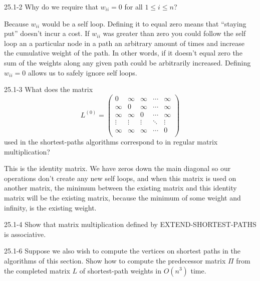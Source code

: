 




\homeworkheader{\classnameandsection}

\begin{problem}{25.1-2}
  Why do we require that $w_{ii} = 0$ for all $1 \le i \le n$?
  \begin{solution}
    Because $w_{ii}$ would be a self loop. Defining it to equal zero means that ``staying put'' doesn't incur a cost. If
    $w_{ii}$ was greater than zero you could follow the self loop an a particular node in a path an arbitrary amount of
    times and increase the cumulative weight of the path.  In other words, if it doesn't equal zero the sum of the
    weights along any given path could be arbitrarily increased. Defining $w_{ii} = 0$ allows us to safely ignore self
    loops.
  \end{solution}
\end{problem}

\begin{problem}{25.1-3}
What does the matrix
\[
 L^{(0)} =
 \begin{pmatrix}
  0 & \infty & \infty & \cdots & \infty\\
  \infty & 0 & \infty & \cdots & \infty\\
  \infty & \infty & 0 & \cdots & \infty\\
  \vdots & \vdots & \vdots & \ddots & \vdots \\
  \infty & \infty & \infty & \cdots & 0 \\
 \end{pmatrix}
\]
used in the shortest-paths algorithms correspond to in regular matrix multiplication?
  \begin{solution}
    This is the identity matrix. We have zeros down the main diagonal so our operations don't create any new self loops,
    and when this matrix is used on another matrix, the minimum between the existing matrix and this identity matrix
    will be the existing matrix, because the minimum of some weight and infinity, is the existing weight.
  \end{solution}
\end{problem}

\begin{problem}{25.1-4}
  Show that matrix multiplication defined by EXTEND-SHORTEST-PATHS is associative.
\end{problem}

\begin{problem}{25.1-6}
Suppose we also wish to compute the vertices on shortest paths in the algorithms of this section. Show how to compute
the predecessor matrix $\Pi$ from the completed matrix $L$ of shortest-path weights in $O(n^3)$ time.
\end{problem}

